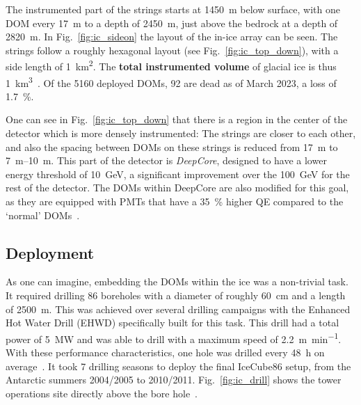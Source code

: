 The instrumented part of the strings starts at \SI{1450}{\m} below surface, with one DOM every \SI{17}{\m} to a depth of \SI{2450}{\m}, just above the bedrock at a depth of \SI{2820}{\m}. In Fig.~\ref{fig:ic_sideon} the layout of the in-ice array can be seen. The strings follow a roughly hexagonal layout (see Fig.~\ref{fig:ic_top_down}), with a side length of \SI{1}{\km\squared}. The \textbf{total instrumented volume} of glacial ice is thus \SI{1}{\km\cubed}~\cite{Aartsen2017}. Of the 5160 deployed DOMs, 92 are dead as of March 2023, a loss of \SI{1.7}{\percent}.

One can see in Fig.~\ref{fig:ic_top_down} that there is a region in the center of the detector which is more densely instrumented: The strings are closer to each other, and also the spacing between DOMs on these strings is reduced from \SI{17}{\m} to \SIrange{7}{10}{\m}. This part of the detector is \textit{DeepCore}, designed to have a lower energy threshold of \SI{10}{\GeV}, a significant improvement over the \SI{100}{\GeV} for the rest of the detector. The DOMs within DeepCore are also modified for this goal, as they are equipped with PMTs that have a \SI{35}{\percent} higher QE compared to the `normal' DOMs~\cite{Aartsen2017}.


\subsection{Deployment}
As one can imagine, embedding the DOMs within the ice was a non-trivial task. It required drilling 86 boreholes with a diameter of roughly \SI{60}{\cm} and a length of \SI{2500}{\m}. This was achieved over several drilling campaigns with the Enhanced Hot Water Drill (EHWD) specifically built for this task. This drill had a total power of \SI{5}{\mega\W} and was able to drill with a maximum speed of \SI{2.2}{\meter\per\minute}. With these performance characteristics, one hole was drilled every \SI{48}{\hour} on average~\cite{Aartsen2017}. It took 7 drilling seasons to deploy the final IceCube86 setup, from the Antarctic summers 2004/2005 to 2010/2011. Fig.~\ref{fig:ic_drill} shows the tower operations site directly above the bore hole~.

